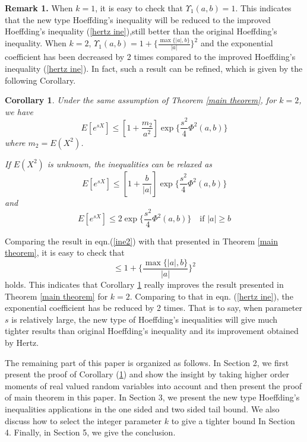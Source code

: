 \documentclass[journal]{IEEEtran}
\newtheorem{cor}{Corollary}
\begin{document}
\textbf{Remark 1.} When $k=1$, it is easy to check that $\Upsilon_1(a,b)=1$. This indicates that the new type Hoeffding's inequality will be reduced to the improved Hoeffding's inequality (\ref{hertz ine}),still better than the original Hoeffding's inequality. When $k=2$, $\Upsilon_1(a,b)=1+\{\frac{\max\{|a|,b\}}{|a|}\}^2$ and the exponential coefficient has been decreased by 2 times compared to the improved Hoeffding's inequality (\ref{hertz ine}). In fact, such a result can be refined, which is given by the following Corollary.

\begin{cor}\label{cor k equals 2}
Under the same assumption of Theorem \ref{main theorem}, for $k=2$, we have
\begin{equation}
  E[e^{sX}]\leq [1+\frac{m_2}{a^2}] \exp\Big\{\frac{s^2}{4}\Phi^2(a,b)\Big\}
\end{equation}
where $m_2=E(X^2)$.

If $E(X^2)$ is unknown, the inequalities can be relaxed as
\begin{equation}
  E[e^{sX}]\leq  [1+\frac{b}{|a|}] \exp\Big\{\frac{s^2}{4}\Phi^2(a,b)\Big\}
      \end{equation}
      and
    \begin{equation} \label{ine2}
  E[e^{sX}]\leq  2 \exp\Big\{\frac{s^2}{4}\Phi^2(a,b)\Big \} \quad \text{if } |a| \geq b
      \end{equation}
\end{cor}

Comparing the result in eqn.(\ref{ine2}) with that presented in Theorem \ref{main theorem}, it is easy to check that
 \begin{equation}
  [1+\frac{b}{|a|}]\leq 1+\{\frac{\max\{|a|,b\}}{|a|}\}^2
 \end{equation}
 holds.  This indicates that Corollary \ref{cor k equals 2} really improves the result presented in Theorem \ref{main theorem} for $k=2$. Comparing to that in eqn. (\ref{hertz ine}),  the exponential coefficient has be reduced by  2 times. That is to say, when parameter $s$ is relatively large, the new type of Hoeffding's inequalities will give much tighter results than original Hoeffding's inequality and its improvement obtained by Hertz.

The remaining part of this paper is organized as follows. In Section 2, we first present the  proof of Corollary (\ref{cor k equals 2}) and show the insight by taking higher order moments of real valued random variables into account and then present the proof of main theorem in this paper. In Section 3, we present the new type Hoeffding's inequalities applications in the one sided and two sided tail bound. We also discuss how to select the integer parameter $k$ to give a tighter bound In Section 4. Finally, in Section 5, we give the conclusion.
\end{document}
